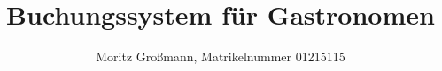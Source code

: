 


	
	\title{Buchungssystem für Gastronomen}
	\author{Moritz Großmann, Matrikelnummer 01215115}
	\maketitle
	
	\newpage
	
	\tableofcontents
	
	
	
	
	
	
	
	
	
	
	
	
	
	
